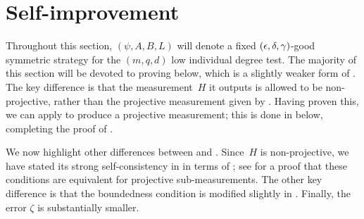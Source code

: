
\section{Self-improvement}
\label{sec:self-improvement}

Throughout this section, $(\psi, A, B, L)$ will denote a fixed $(\epsilon, \delta, \gamma)$-good symmetric strategy for the $(m,q,d)$ low individual degree test.
The majority of this section will be devoted to proving  below,
which is a slightly weaker form of .
The key difference is that the measurement~$H$ it outputs is allowed to be non-projective,
rather than the projective measurement given by .
Having proven this, we can apply 
to produce a projective measurement;
this is done in  below,
completing the proof of .

We now highlight other differences between 
and .
Since~$H$ is non-projective, 
we have stated its strong self-consistency in 
in terms of ; see 
for a proof that these conditions are equivalent for projective sub-measurements.
The other key difference is that the boundedness condition is modified slightly in .
Finally, the error $\zeta$ is substantially smaller.

